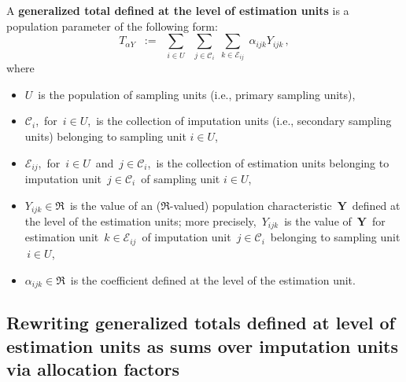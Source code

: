 
\vskip 0.5cm
\begin{definition}
\mbox{}
\vskip 0.1cm
\noindent
A \textbf{generalized total defined at the level of estimation units}
is a population parameter of the following form:
\begin{equation*}
T_{\alpha Y}
\;\; := \;\;
    \underset{i \in U}{\sum}\;\;
    \underset{j \in \mathcal{C}_{i}}{\sum}\;
    \underset{k \in \mathcal{E}_{ij}}{\sum}\;
    \alpha_{ijk}Y_{ijk}\,,
\end{equation*}
where
\begin{itemize}
\item
    $U$\, is the population of sampling units (i.e., primary sampling units),
\item
    $\mathcal{C}_{i}$,\, for \,$i \in U$,\,
    is the collection of imputation units (i.e., secondary sampling units)
    belonging to sampling unit $i \in U$,
\item
    $\mathcal{E}_{ij}$,\, for \,$i \in U$\, and \,$j \in \mathcal{C}_{i}$,\,
    is the collection of estimation units
    belonging to imputation unit \,$j \in \mathcal{C}_{i}$\, of sampling unit $i \in U$,
\item
    $Y_{ijk} \in \Re$\, is the value
    of an ($\Re$-valued) population characteristic \,$\mathbf{Y}$\,
    defined at the level of the estimation units; more precisely,
    \,$Y_{ijk}$\, is the value of \,$\mathbf{Y}$\,
    for estimation unit \,$k \in \mathcal{E}_{ij}$\,
    of imputation unit \,$j \in \mathcal{C}_{i}$\,
    belonging to sampling unit \,$i \in U$,\,
\item
    $\alpha_{ijk} \in \Re$\, is the coefficient defined at the level of the estimation unit.
\end{itemize}
\end{definition}


\vskip 1.0cm
\subsection{Rewriting generalized totals defined at level of estimation units as sums over imputation units via allocation factors}
\label{Whatever}
\setcounter{theorem}{0}


